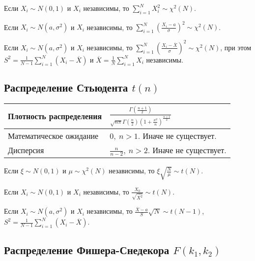 Если $X_i \sim N(0,1)$ и $X_i$ независимы, то $\sum\limits_{i=1}^NX_i^2 \sim \chi^2(N)$.

Если $X_i \sim N(a, \sigma^2)$ и $X_i$ независимы, то $\sum\limits_{i=1}^N \left(\frac{X_i - a}{\sigma}\right)^2 \sim \chi^2(N)$.

Если $X_i \sim N(a, \sigma^2)$ и $X_i$ независимы, то $\sum\limits_{i=1}^N \left(\frac{X_i - \overline{X}}{\sigma}\right)^2 \sim \chi^2(N)$, при этом $S^2 = \frac{1}{N-1}\sum\limits_{i=1}^N\left(X_i - \overline{X}\right)$ и $\overline{X} = \frac{1}{N}\sum\limits_{i=1}^N X_i$ независимы.

\subsection{Распределение Стьюдента $t(n)$}

\begin{table}[ht]
    \centering
    \begin{tabular}{|l|l|}
    \hline
    Плотность распределения& $\displaystyle\frac{\Gamma\left(\frac{n+1}{2}\right)}{\sqrt{n\pi}\Gamma\left(\frac{n}{2}\right)\left(1+\frac{x^2}{n}\right)^{\frac{n+1}{2}}}$\\
    \hline
    Математическое ожидание& $0, \: n > 1$. Иначе не существует. \\
    \hline
    Дисперсия& $\frac{n}{n-2}, \: n > 2$. Иначе не существует.\\
    \hline
    \end{tabular}
\end{table}

Если $\xi \sim N(0,1)$ и $\mu \sim \chi^2(N)$ независимы, то $\xi \sqrt{\frac{N}{\mu}} \sim t(N)$.

Если $X_i \sim N(0,1)$ и $X_i$ независимы, то $\frac{X_0}{\sqrt{\overline{X^2}}}\sim t(N)$.

Если $X_i \sim N(a, \sigma^2)$ и $X_i$ независимы, то $\frac{\overline{X}-a}{S}\sqrt{N}\sim t(N-1)$, $S^2 = \frac{1}{N-1}\sum\limits_{i=1}^N\left(X_i - \overline{X}\right)$.

\subsection{Распределение Фишера-Снедекора $F(k_1, k_2)$}

